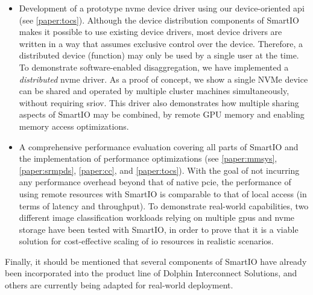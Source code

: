 \begin{itemize}
    \item Development of a prototype \gls{nvme} device driver using our device-oriented \gls{api} (see \cref{paper:tocs}).
    Although the device distribution components of SmartIO makes it possible to use existing device drivers, most device drivers are written in a way that assumes exclusive control over the device. Therefore, a distributed device (function) may only be used by a single user at the time.
    To demonstrate software-enabled \gls{disaggregation}, we have implemented a \emph{distributed} \gls{nvme} driver. As a proof of concept, we show a single NVMe device can be shared and operated by multiple cluster machines simultaneously, without requiring \gls{sriov}.
	This driver also demonstrates how multiple sharing aspects of SmartIO may be combined, 
	by  remote GPU memory and enabling memory access optimizations.

    \item A comprehensive performance evaluation covering all parts of SmartIO and the implementation of performance optimizations (see \cref{paper:mmsys}, \cref{paper:srmpds}, \cref{paper:cc}, and \cref{paper:tocs}). With the goal of not incurring any performance overhead beyond that of native \gls{pcie}, the performance of using remote resources with SmartIO is comparable to that of local access (in terms of latency and throughput).
    To demonstrate real-world capabilities, two different image classification workloads relying on multiple \glspl{gpu} and \gls{nvme} storage have been tested with SmartIO, in order to prove that it is a viable solution for cost-effective scaling of \gls{io} resources in realistic scenarios.
	
\end{itemize}


Finally, it should be mentioned that several components of SmartIO have already been incorporated into the product line of Dolphin Interconnect Solutions, and others are currently being adapted for real-world deployment.


%
%
%
%		
%		

